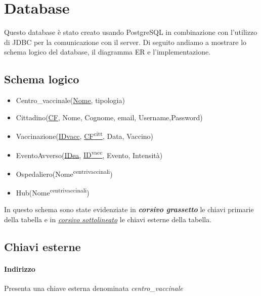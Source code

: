 \section{Database}

	Questo database è stato creato usando PostgreSQL in combinazione con l’utilizzo di JDBC per la comunicazione con il server.
	Di seguito andiamo a mostrare lo schema logico del database, il diagramma ER e l’implementazione.
	
\subsection{Schema logico}

	\begin{itemize}
		\item Centro\_vaccinale(\underline{Nome}, tipologia)
		
		\item Cittadino(\underline{CF}, Nome, Cognome, email, Username,Password)
		
		\item Vaccinazione(\underline{IDvacc}, \underline{CF\textsuperscript{citt}}, Data, Vaccino)
		
		\item EventoAvverso(\underline{IDea}, \underline{ID\textsuperscript{vacc}}, Evento, Intensità)
		
		\item Ospedaliero(Nome\textsuperscript{centrivaccinali})
		
		\item Hub(Nome\textsuperscript{centrivaccinali})
	\end{itemize}
	
	In questo schema sono state evidenziate in \textbf{\textit{corsivo grassetto}} le chiavi primarie della tabella e in \underline{\textit{corsivo sottolineato}} le chiavi esterne della tabella.
	
\subsection{Chiavi esterne}
	
	\paragraph{Indirizzo}
	Presenta una chiave esterna denominata \emph{centro\_vaccinale} 

